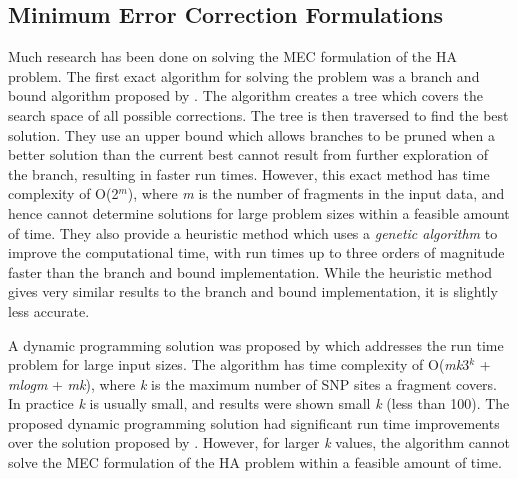 \documentclass[10pt,a4paer,twocolumn]{article}
\newcommand{\K}{\textit{k }}
\newcommand{\M}{\textit{m }}
\begin{document}
\subsection{Minimum Error Correction Formulations} \label{sec:mecimp}

Much research has been done on solving the MEC formulation of the HA problem. The first exact algorithm for
solving the problem was a branch and bound algorithm proposed by \cite{wang:2005}. The algorithm creates a
tree which covers the search space of all possible corrections. The tree is then traversed to find the best
solution. They use an upper bound which allows branches to be pruned when a better solution than the current 
best cannot result from further exploration of the branch, resulting in faster run times. However, this exact 
method has time complexity of O(2$^{\textit{m}}$), where \M is the number of fragments in the input data, and 
hence cannot determine solutions for large problem sizes within a feasible amount of time. They also 
provide a heuristic method which uses a \textit{genetic algorithm} to improve the computational time, with
run times up to three orders of magnitude faster than the branch and bound implementation. While the heuristic
method gives very similar results to the branch and bound implementation, it is slightly less accurate. 

A dynamic programming solution was proposed by \cite{xie:2008} which addresses the run time problem for large
input sizes. The algorithm has time complexity of O(\textit{mk}3$^{\textit{k}}$ + \textit{mlogm} +
\textit{mk}), where \K is the maximum number of SNP sites a fragment covers. In practice \K is usually small,
and results were shown small \K (less than 100). The proposed dynamic programming solution had significant run
time improvements over the solution proposed by \cite{wang:2005}. However, for larger \K values, the 
algorithm cannot solve the MEC formulation of the HA problem within a feasible amount of time. 
\end{document}
